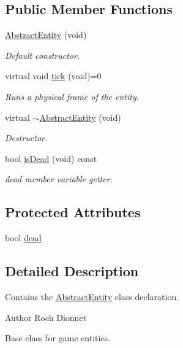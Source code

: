 \subsection*{Public Member Functions}
\begin{DoxyCompactItemize}
\item 
\hyperlink{class_abstract_entity_a4df93a42a764660b849deb5e18efff5e}{Abstract\+Entity} (void)
\begin{DoxyCompactList}\small\item\em Default constructor. \end{DoxyCompactList}\item 
virtual void \hyperlink{class_abstract_entity_ac5602c7978aa4eaff46aa206f06046d7}{tick} (void)=0
\begin{DoxyCompactList}\small\item\em Runs a physical frame of the entity. \end{DoxyCompactList}\item 
virtual \hyperlink{class_abstract_entity_ab5efb435d782e095168ce6199fe2508a}{$\sim$\+Abstract\+Entity} (void)
\begin{DoxyCompactList}\small\item\em Destructor. \end{DoxyCompactList}\item 
bool \hyperlink{class_abstract_entity_a6fa6c7e34a763083ddf813c5f069e400}{is\+Dead} (void) const 
\begin{DoxyCompactList}\small\item\em dead member variable getter. \end{DoxyCompactList}\end{DoxyCompactItemize}
\subsection*{Protected Attributes}
\begin{DoxyCompactItemize}
\item 
bool \hyperlink{class_abstract_entity_acb290d7867b8b032c2535632d270584a}{dead}
\end{DoxyCompactItemize}


\subsection{Detailed Description}
Contains the \hyperlink{class_abstract_entity}{Abstract\+Entity} class declaration. 

\begin{DoxyAuthor}{Author}
Roch Dionnet
\end{DoxyAuthor}
Base class for game entities. 

